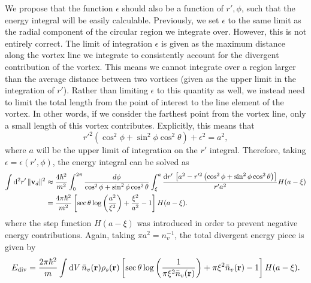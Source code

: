 \documentclass[onecolumn,nofootinbib,superscriptaddress]{revtex4}
\newcommand{\dd}[1]{\mathrm{d}#1\,}
\begin{document}
We propose that the function $\epsilon$ should also be a function of $r', \phi$, such that the energy integral will be easily calculable.  Previously, we set $\epsilon$ to the same limit as the radial component of the circular region we integrate over.  However, this is not entirely correct.  The limit of integration $\epsilon$ is given as the maximum distance along the vortex line we integrate to consistently account for the divergent contribution of the vortex.  This means we cannot integrate over a region larger than the average distance between two vortices (given as the upper limit in the integration of $r'$).  Rather than limiting $\epsilon$ to this quantity as well, we instead need to limit the total length from the point of interest to the line element of the vortex.  In other words, if we consider the farthest point from the vortex line, only a small length of this vortex contributes.  Explicitly, this means that
\begin{equation}
r'^2\left(\cos^2\phi + \sin^2\phi\cos^2\theta\right) + \epsilon^2 = a^2,
\end{equation}
where $a$ will be the upper limit of integration on the $r'$ integral.  Therefore, taking $\epsilon = \epsilon(r',\phi)$, the energy integral can be solved as
\begin{align}
\int \dd{^2 r'} \|{\bf v}_d\|^2 &\approx \frac{4\hbar^2}{m^2}\int^{2\pi}_0\frac{d\phi}{\cos^2\phi + \sin^2\phi\cos^2\theta}\int_\xi^a \frac{\dd{r'}\left[a^2 - r'^2\left(\cos^2\phi + \sin^2\phi\cos^2\theta\right)\right]}{r' a^2} H(a - \xi) \\
&= \frac{4\pi\hbar^2}{m^2}\left[\sec\theta\log\left(\frac{a^2}{\xi^2}\right) + \frac{\xi^2}{a^2}-1\right] H(a - \xi) .\label{EQ:VelDivInt}
\end{align}
where the step function $H(a - \xi)$ was introduced in order to prevent negative energy contributions. Again, taking $\pi a^2 = n_v^{-1}$, the total divergent energy piece is given by
\begin{equation}
E_\text{div} = \frac{2\pi \hbar^2}{m}\int \dd{V} \bar{n}_v({\bf r}) \rho_s({\bf r})\left[\sec\theta\log\left(\frac{1}{\pi\xi^2 \bar{n}_v({\bf r})}\right) + \pi\xi^2\bar{n}_v({\bf r}) - 1\right] H(a - \xi).
\end{equation}
\end{document}
